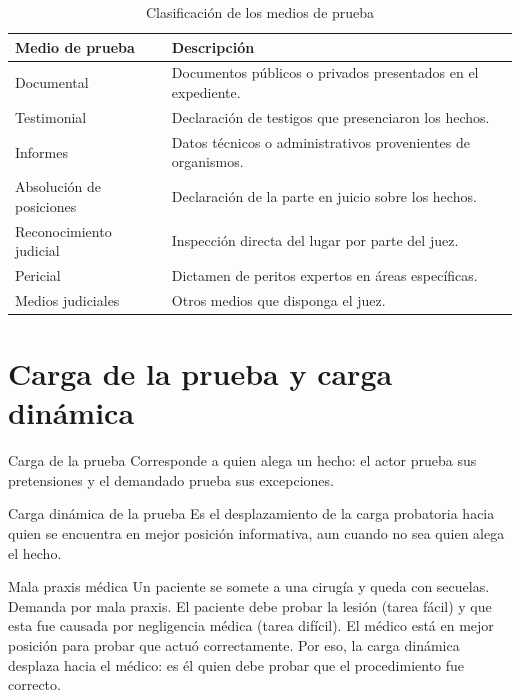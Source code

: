 \documentclass[12pt,oneside]{book}
\begin{document}
\begin{table}[H]
\centering
\begin{tabularx}{\textwidth}{
    >{\raggedright\arraybackslash}p{}
    >{\raggedright\arraybackslash}X
}
\toprule
\textbf{Medio de prueba} & \textbf{Descripción} \\
\midrule
Documental & Documentos públicos o privados presentados en el expediente. \\
Testimonial & Declaración de testigos que presenciaron los hechos. \\
Informes & Datos técnicos o administrativos provenientes de organismos. \\
Absolución de posiciones & Declaración de la parte en juicio sobre los hechos. \\
Reconocimiento judicial & Inspección directa del lugar por parte del juez. \\
Pericial & Dictamen de peritos expertos en áreas específicas. \\
Medios judiciales & Otros medios que disponga el juez. \\
\bottomrule
\end{tabularx}
\caption{Clasificación de los medios de prueba}
\end{table}

\section{Carga de la prueba y carga dinámica}

\begin{definition}{Carga de la prueba}
Corresponde a quien alega un hecho: el actor prueba sus pretensiones y el demandado prueba sus excepciones.
\end{definition}

\begin{definition}{Carga dinámica de la prueba}
Es el desplazamiento de la carga probatoria hacia quien se encuentra en mejor posición informativa, aun cuando no sea quien alega el hecho.
\end{definition}

\begin{example}{Mala praxis médica}
Un paciente se somete a una cirugía y queda con secuelas. Demanda por mala praxis. El paciente debe probar la lesión (tarea fácil) y que esta fue causada por negligencia médica (tarea difícil). El médico está en mejor posición para probar que actuó correctamente. Por eso, la carga dinámica desplaza hacia el médico: es él quien debe probar que el procedimiento fue correcto.
\end{example}
\end{document}
